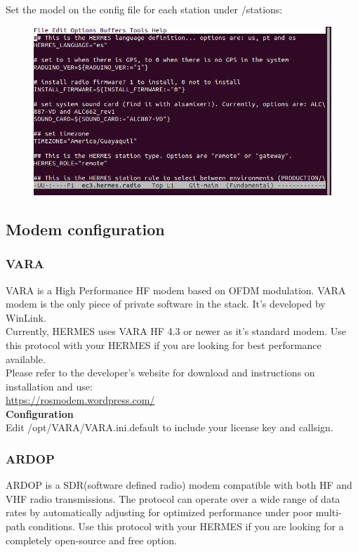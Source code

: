 \documentclass[11pt,a4paper]{article}
\begin{document}
Set the model on the config file for each station under /stations:

\begin{figure}[h!]
  \centering
  \includegraphics[scale=0.45]{screenshots/software_stack/set_system_soundcard.png}
  \label{fig4}
\end{figure}

\subsection{Modem configuration}
\subsubsection{VARA}
VARA is a High Performance HF modem based on OFDM modulation.
VARA modem is the only piece of private software in the stack.
It's developed by WinLink.\\
Currently, HERMES uses VARA HF 4.3 or newer as it's standard modem.
Use this protocol with your HERMES if you are looking for best performance available.\\

Please refer to the developer's website for download and instructions on installation and use: \\
\url{https://rosmodem.wordpress.com/}\\

\textbf{Configuration}\\
Edit /opt/VARA/VARA.ini.default to include your license key and callsign.

\subsubsection{ARDOP}

ARDOP is a SDR(software defined radio) modem compatible with both HF and VHF radio transmissions.
The protocol can operate over a wide range of data rates by automatically adjusting for optimized performance under poor multi-path conditions.
Use this protocol with your HERMES if you are looking for a completely open-source and free option.
\end{document}

